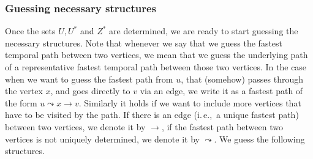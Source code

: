 \documentclass[a4paper,UKenglish,cleveref, autoref, thm-restate]{lipics-v2021}
\newcommand{\ie}{i.\,e.,\ }
\begin{document}
\subsubsection{Guessing necessary structures \label{sec:FPT-guessing}}
Once the sets $U, U^*$ and $Z^*$ are determined, we are ready to start guessing  the necessary structures.
Note that whenever we say that we guess the fastest temporal path between two vertices, we mean that we guess the underlying path of a representative fastest temporal path between those two vertices.
In the case when we want to guess the fastest path from $u$, that (somehow) passes through the vertex $x$, and goes directly to $v$ via an edge, we write it as a fastest path of the form $u \leadsto x \rightarrow v$.
Similarly it holds if we want to include more vertices that have to be visited by the path. If there is an edge (\ie a unique fastest path) between two vertices, we denote it by $\rightarrow$,
if the fastest path between two vertices is not uniquely determined, we denote it by $\leadsto$.
We guess the following structures.
\end{document}
